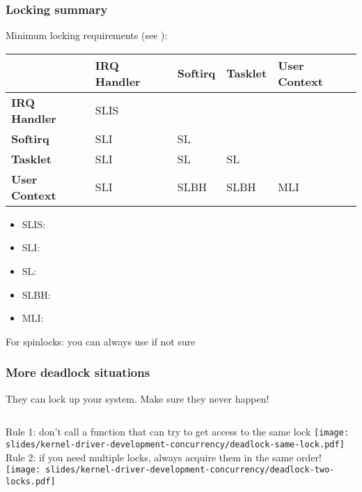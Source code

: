 \begin{frame}[fragile]
  \frametitle{Locking summary}
  Minimum locking requirements (see ):
  
\begin{table}
\centering
\begin{tabular}{l|l|l|l|l|}
                      & \textbf{IRQ Handler} & \textbf{Softirq} & \textbf{Tasklet} & \textbf{User Context}  \\ 
\hline
\textbf{IRQ Handler}  & SLIS                 &                  &                  &                        \\ 
\hline
\textbf{Softirq}      & SLI                  & SL               &                  &                        \\ 
\hline
\textbf{Tasklet}      & SLI                  & SL               & SL               &                        \\ 
\hline
\textbf{User Context} & SLI                  & SLBH             & SLBH             & MLI                    \\
\hline
\end{tabular}
\end{table}

\begin{footnotesize}
\begin{itemize}
 \item SLIS: 
 \item SLI: 
 \item SL: 
 \item SLBH: 
 \item MLI: 
\end{itemize}
\end{footnotesize}

For spinlocks: you can always use  if not sure

\end{frame}

\begin{frame}
  \frametitle{More deadlock situations} They can lock up your system. Make sure they never happen!
  \vspace{0.5cm}
  \begin{columns}
      Rule 1: don't call a function that can try to get access to the same lock
      \texttt{[image: slides/kernel-driver-development-concurrency/deadlock-same-lock.pdf]}
      Rule 2: if you need multiple locks, always acquire them in the same order!
      \texttt{[image: slides/kernel-driver-development-concurrency/deadlock-two-locks.pdf]}
  \end{columns}
\end{frame}

